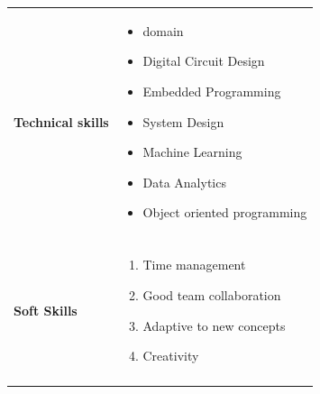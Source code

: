 \documentclass[a4paper,11pt,oneside]{article}
\begin{document}
 \newpage
 \noindent \begin{tabular}{@{} p{} p{\textwidth}}
     \textbf{\large{Technical skills }}
        & \vspace{-2em}
          \begin{itemize}
            \setlength\itemsep{0.1em}
            \item domain
            \item Digital Circuit Design
            \item Embedded Programming
            \item System Design
            \item Machine Learning
            \item Data Analytics
            \item Object oriented programming
        \end{itemize}\\ \\
        
     \textbf{\large{Soft Skills}}
        & \vspace{-2em}
          \begin{enumerate}
            \setlength\itemsep{0.1em}
            \item Time management
            \item Good team collaboration
            \item Adaptive to new concepts
            \item Creativity
          \end{enumerate} \\ \\
     

\end{tabular}
\end{document}

